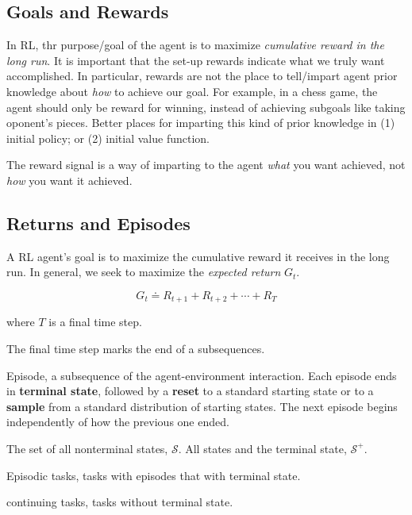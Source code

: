 \documentclass[lang=en,mode=geye,device=normal,color=blue,14pt]{elegantnote}
\DeclareMathOperator*{\1}{\mathbbm{1}}
\begin{document}
\subsection{Goals and Rewards}
 In RL, thr purpose/goal of the agent is to maximize \textit{cumulative reward in the long run}.
 It is important that the set-up rewards indicate what we truly want accomplished.
 In particular, rewards are not the place to tell/impart agent prior knowledge about \textit{how} to achieve our goal.
 For example, in a chess game, the agent should only be reward for winning, instead of achieving subgoals like taking oponent's pieces.
 Better places for imparting this kind of prior knowledge in (1) initial policy; or (2) initial value function.
 
 The reward signal is a way of imparting to the agent \textit{what} you want achieved, not \textit{how} you want it achieved.

\subsection{Returns and Episodes}

A RL agent's goal is to maximize the cumulative reward it receives in the long run.
In general, we seek to maximize the \textit{expected return} $G_t$.

$$ G_t \doteq R_{t+1} + R_{t+2} + \cdots + R_T $$

where $T$ is a final time step.

The final time step marks the end of a subsequences.

\begin{definition}
Episode, a subsequence of the agent-environment interaction. Each episode ends in \textbf{terminal state}, followed by a \textbf{reset} to a standard starting state or to a \textbf{sample} from a standard distribution of starting states. The next episode begins independently of how the previous one ended.
\end{definition}

The set of all nonterminal states, $\mathcal{S}$. All states and the terminal state, $\mathcal{S^+}$.

\begin{definition}
Episodic tasks, tasks with episodes that with terminal state.
\end{definition}

\begin{definition}
continuing tasks, tasks without terminal state.
\end{definition}
\end{document}
